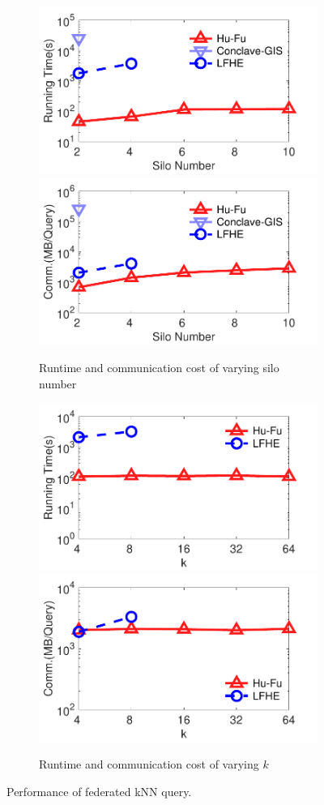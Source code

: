 \begin{figure}[t]
    \centering
    \begin{subfigure}{0.48\textwidth}
        \centering
        \includegraphics[width=0.48\linewidth]{traffic_knn_silo_time.pdf}
        \includegraphics[width=0.48\linewidth]{traffic_knn_silo_comm.pdf}
        \caption{Runtime and communication cost of varying silo number}
        \label{fig:symmetric-knn-eff-silo-n}
    \end{subfigure}
    \begin{subfigure}{0.48\textwidth}
        \centering
        \includegraphics[width=0.48\linewidth]{traffic_knn_k_time.pdf}
        \includegraphics[width=0.48\linewidth]{traffic_knn_k_comm.pdf}
        \caption{Runtime and communication cost of varying $k$}
        \label{fig:symmetric-knn-eff-k}
    \end{subfigure}
    \caption{Performance of federated kNN query.}
    \label{fig:symmetric-knn-eff}
\end{figure}

